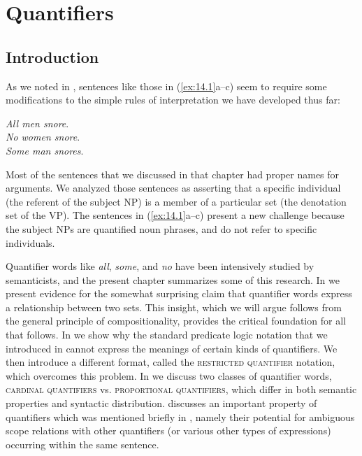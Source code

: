 \chapter{Quantifiers}\label{sec:14}

\section{Introduction}\label{sec:14.1}

As we noted in , sentences like those in (\ref{ex:14.1}a--c) seem to require some modifications to the simple rules of interpretation we have developed thus far:


\ea \label{ex:14.1}
\ea \textit{All men snore}.\\
\ex \textit{No women snore}.\\
\ex \textit{Some man snores}.
                       \z
\z


Most of the sentences that we discussed in that chapter had proper names for arguments. We analyzed those sentences as asserting that a specific individual (the referent of the subject NP) is a member of a particular set (the denotation set of the VP). The sentences in (\ref{ex:14.1}a--c) present a new challenge because the subject NPs are quantified noun phrases, and do not refer to specific individuals.



Quantifier words like \textit{all}, \textit{some}, and \textit{no} have been intensively studied by semanticists, and the present chapter summarizes some of this research. In  we present evidence for the somewhat surprising claim that quantifier words express a relationship between two sets. This insight, which we will argue follows from the general principle of compositionality, provides the critical foundation for all that follows. In  we show why the standard predicate logic notation that we introduced in  cannot express the meanings of certain kinds of quantifiers. We then introduce a different format, called the \textsc{restricted quantifier} notation, which overcomes this problem. In  we discuss two classes of quantifier words, \textsc{cardinal quantifiers} vs. \textsc{proportional quantifiers}, which differ in both semantic properties and syntactic distribution.  discusses an important property of quantifiers which was mentioned briefly in , namely their potential for ambiguous scope relations with other quantifiers (or various other types of expressions) occurring within the same sentence.


